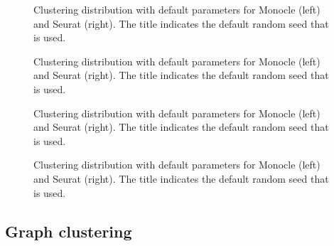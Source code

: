\begin{figure}[H]
    \centering
    \caption{\label{fig:s4-m3-n-graph-type}Clustering distribution with default parameters for Monocle (left) and Seurat (right). The title indicates the default random seed that is used.}
\end{figure}

\begin{figure}[H]
    \centering
    \caption{\label{fig:s4-m3-snn-1}Clustering distribution with default parameters for Monocle (left) and Seurat (right). The title indicates the default random seed that is used.}
\end{figure}

\begin{figure}[H]
    \centering
    \caption{\label{fig:s4-m3-snn-2}Clustering distribution with default parameters for Monocle (left) and Seurat (right). The title indicates the default random seed that is used.}
\end{figure}

\begin{figure}[H]
    \centering
    \caption{\label{fig:s4-m3-snn-3}Clustering distribution with default parameters for Monocle (left) and Seurat (right). The title indicates the default random seed that is used.}
\end{figure}
\subsection{Graph clustering}










